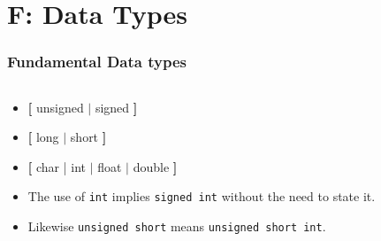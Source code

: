 \section{F: Data Types}


\begin{frame}[fragile]
\frametitle{Fundamental Data types}

\begin{columns}

\begin{column}[c]{0.35\textwidth}
{\small
\begin{itemize}
\item {\bf [} unsigned $|$ signed {\bf ]}
\item {\bf [} long $|$ short {\bf ]}
\item {\bf [} char | int $|$ float $|$ double {\bf ]}
\item The use of {\tt int} implies {\tt signed int} without the need to state it.
\item Likewise {\tt unsigned short} means {\tt unsigned short int}.
\end{itemize}
}
\end{column}


\end{columns}
\end{frame}
